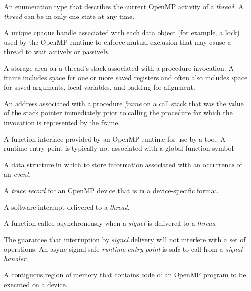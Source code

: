 \glossarydefstart
An enumeration type that describes the current OpenMP activity  of a 
\emph{thread}. A \emph{thread} can be in only one state at any time.
\glossarydefend

\glossarydefstart
A unique opaque handle associated with each data object (for example, a lock) 
used by the OpenMP runtime to enforce mutual exclusion that may cause a thread 
to wait actively or passively.
\glossarydefend

\glossarydefstart
A storage area on a thread's stack associated with a procedure invocation. 
A frame includes space for one or more saved registers and often also 
includes space for saved arguments, local variables,
and padding for alignment.
\glossarydefend

\glossarydefstart
An address associated with a procedure \emph{frame} on a call stack that 
was the value of the stack pointer immediately prior to calling the procedure 
for which the invocation is represented by the frame.
\glossarydefend

\glossarydefstart
A function interface provided by an OpenMP runtime for use by a tool. 
A runtime entry point is typically not associated with a global function symbol.
\glossarydefend

\glossarydefstart
A data structure in which to store information associated with an 
occurrence of an \emph{event}.
\glossarydefend

\glossarydefstart
A \emph{trace record} for an OpenMP device that is in a device-specific format.
\glossarydefend

\glossarydefstart
A software interrupt delivered to a \emph{thread}.
\glossarydefend

\glossarydefstart
A function called asynchronously when a \emph{signal} is delivered to 
a \emph{thread}.
\glossarydefend

\glossarydefstart
The guarantee that interruption by \emph{signal} delivery will not
interfere with a set of operations.
An async signal safe \emph{runtime entry point} is safe to call 
from a \emph{signal handler}.
\glossarydefend

\glossarydefstart
A contiguous region of memory that contains code of an OpenMP program 
to be executed on a device.
\glossarydefend

